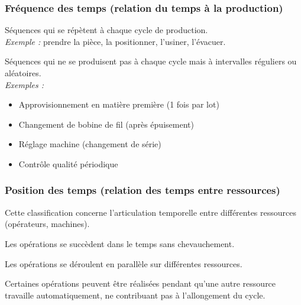 \documentclass[a4paper,12pt]{article}
\begin{document}
\subsubsection{Fréquence des temps (relation du temps à la production)}

\begin{description}[labelwidth=4cm]
    \item[Temps cycliques] Séquences qui se répètent à chaque cycle de production. \\
    \textit{Exemple :} prendre la pièce, la positionner, l'usiner, l'évacuer.
    
    \item[Temps fréquentiels] Séquences qui ne se produisent pas à chaque cycle mais à intervalles réguliers ou aléatoires. \\
    \textit{Exemples :}
    \begin{itemize}
        \item Approvisionnement en matière première (1 fois par lot)
        \item Changement de bobine de fil (après épuisement)
        \item Réglage machine (changement de série)
        \item Contrôle qualité périodique
    \end{itemize}
\end{description}

\subsubsection{Position des temps (relation des temps entre ressources)}

Cette classification concerne l'articulation temporelle entre différentes ressources (opérateurs, machines).

\begin{description}[labelwidth=4cm]
    \item[Temps séquentiels] Les opérations se succèdent dans le temps sans chevauchement.
    
    \item[Temps simultanés] Les opérations se déroulent en parallèle sur différentes ressources.
    
    \item[Temps masqués] Certaines opérations peuvent être réalisées pendant qu'une autre ressource travaille automatiquement, ne contribuant pas à l'allongement du cycle.
\end{description}
\end{document}

